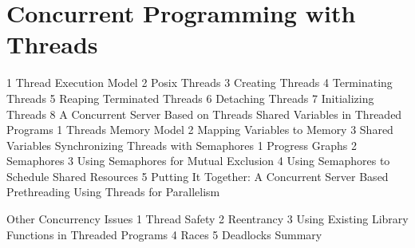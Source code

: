 \section{Concurrent Programming with Threads}
1 Thread Execution Model
2 Posix Threads
3 Creating Threads
4 Terminating Threads
5 Reaping Terminated Threads
6 Detaching Threads
7 Initializing Threads
8 A Concurrent Server Based on Threads
Shared Variables in Threaded Programs
1 Threads Memory Model
2 Mapping Variables to Memory
3 Shared Variables
Synchronizing Threads with Semaphores
1 Progress Graphs
2 Semaphores
3 Using Semaphores for Mutual Exclusion
4 Using Semaphores to Schedule Shared Resources
5 Putting It Together: A Concurrent Server Based Prethreading
Using Threads for Parallelism




Other Concurrency Issues
1 Thread Safety
2 Reentrancy
3 Using Existing Library Functions in Threaded Programs
4 Races
5 Deadlocks
Summary
